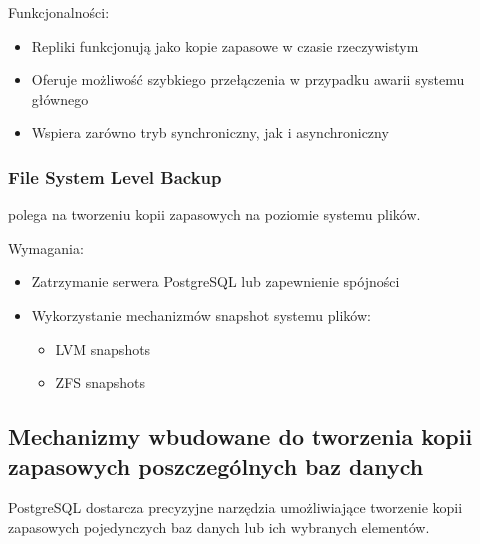 \documentclass[letterpaper,10pt,polish]{sphinxmanual}
\begin{document}
\sphinxAtStartPar
Funkcjonalności:
\begin{itemize}
\item {} 
\sphinxAtStartPar
Repliki funkcjonują jako kopie zapasowe w czasie rzeczywistym

\item {} 
\sphinxAtStartPar
Oferuje możliwość szybkiego przełączenia w przypadku awarii systemu głównego

\item {} 
\sphinxAtStartPar
Wspiera zarówno tryb synchroniczny, jak i asynchroniczny

\end{itemize}


\subsubsection{File System Level Backup}
\label{\detokenize{rozdzial2/Kopie_zapasowe_i_odzyskiwanie_danych/kopie_zapasowe_i_odzyskiwanie_danych:file-system-level-backup}}
\sphinxAtStartPar
{} polega na tworzeniu kopii zapasowych na poziomie systemu plików.

\sphinxAtStartPar
Wymagania:
\begin{itemize}
\item {} 
\sphinxAtStartPar
Zatrzymanie serwera PostgreSQL lub zapewnienie spójności

\item {} 
\sphinxAtStartPar
Wykorzystanie mechanizmów snapshot systemu plików:
\begin{itemize}
\item {} 
\sphinxAtStartPar
LVM snapshots

\item {} 
\sphinxAtStartPar
ZFS snapshots

\end{itemize}

\end{itemize}


\subsection{Mechanizmy wbudowane do tworzenia kopii zapasowych poszczególnych baz danych}
\label{\detokenize{rozdzial2/Kopie_zapasowe_i_odzyskiwanie_danych/kopie_zapasowe_i_odzyskiwanie_danych:mechanizmy-wbudowane-do-tworzenia-kopii-zapasowych-poszczegolnych-baz-danych}}
\sphinxAtStartPar
PostgreSQL dostarcza precyzyjne narzędzia umożliwiające tworzenie kopii zapasowych pojedynczych baz danych lub ich wybranych elementów.
\end{document}
